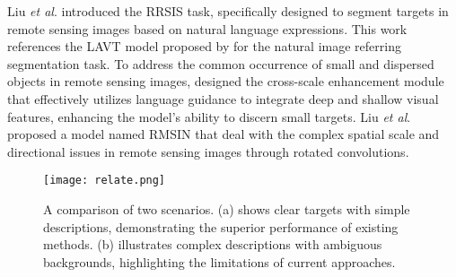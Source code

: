 Liu \textit{et al}. introduced the RRSIS task, specifically designed to segment targets in remote sensing images based on natural language expressions\cite{liu2024rotated}. This work references the LAVT model proposed by\cite{yang2022lavt} for the natural image referring segmentation task. To address the common occurrence of small and dispersed objects in remote sensing images, \cite{yuan2024rrsis} designed the cross-scale enhancement module that effectively utilizes language guidance to integrate deep and shallow visual features, enhancing the model's ability to discern small targets. Liu \textit{et al}. proposed a model named RMSIN that deal with the complex spatial scale and directional issues in remote sensing images through rotated convolutions\cite{liu2024rotated}.
\begin{figure}
    \centering
    \texttt{[image: relate.png]}
    \vspace{-5mm}
    \caption{A comparison of two scenarios. (a) shows clear targets with simple descriptions, demonstrating the superior performance of existing methods. (b) illustrates complex descriptions with ambiguous backgrounds, highlighting the limitations of current approaches. }
    \label{fig:relate}
    
\end{figure}

